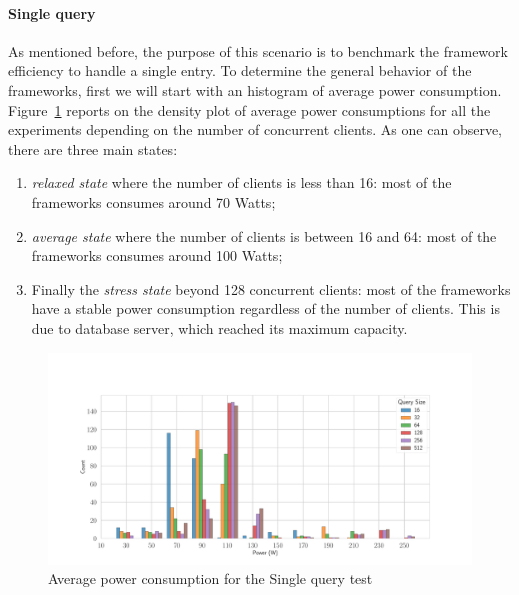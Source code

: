 \paragraph{Single query}
As mentioned before, the purpose of this scenario is to benchmark the framework efficiency to handle a single entry.
To determine the general behavior of the frameworks, first we will start with an histogram of average power consumption.
Figure~\ref{fig:av_power_db} reports on the  density plot of average power consumptions for all the experiments depending on the number of concurrent clients.
As one can observe, there are three main states:
\begin{enumerate}
    \item \emph{relaxed state} where the number of clients is less than 16: most of the frameworks consumes around 70 Watts;
    \item \emph{average state} where the number of clients is between 16 and 64: most of the frameworks consumes around 100 Watts;
    \item Finally the \emph{stress state} beyond 128 concurrent clients: most of the frameworks  have a stable power consumption regardless of the number of clients.
          This is due to database server, which reached its maximum capacity.
\end{enumerate}

\begin{figure}[hbt]
    \centering
    \includegraphics[width=\textwidth,height=\textheight,keepaspectratio]{imgs/histogram_av_power_cpu_db}
    \caption{Average power consumption for the Single query test }
    \label{fig:av_power_db}
\end{figure}

